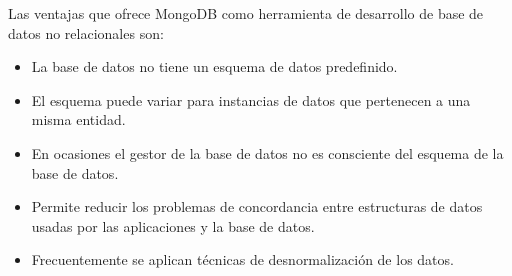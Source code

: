 \documentclass[12pt, a4paper, titlepage]{report}
\begin{document}
	   	Las ventajas que ofrece MongoDB como herramienta de desarrollo de base de datos no relacionales son:
	   	\begin{itemize}
	   		\item La base de datos no tiene un esquema de datos predefinido.
	   		\item El esquema puede variar para instancias de datos que pertenecen a una misma entidad.
	   		\item En ocasiones el gestor de la base de datos no es consciente del esquema de la base de datos.
	   		\item Permite reducir los problemas de concordancia entre estructuras de datos usadas por las aplicaciones y la base de datos.
	   		\item Frecuentemente se aplican técnicas de desnormalización de los datos.
	   	\end{itemize}
\end{document}
